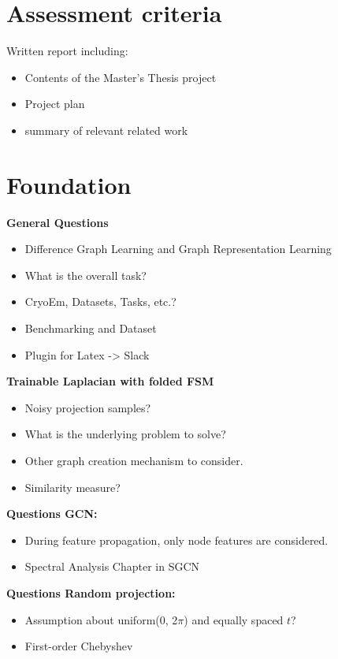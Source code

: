 \chapter{Assessment criteria}
Written report including: 
\begin{itemize}
    \item Contents of the Master's Thesis project
    \item Project plan
    \item summary of relevant related work
\end{itemize}

\chapter{Foundation}

\textbf{General Questions}
\begin{itemize}
    \item Difference Graph Learning and Graph Representation Learning
    \item What is the overall task?
    \item CryoEm, Datasets, Tasks, etc.?
    \item Benchmarking and Dataset
    \item Plugin for Latex -> Slack
\end{itemize}

\textbf{Trainable Laplacian with folded FSM}
\begin{itemize}
    \item Noisy projection samples?
    \item What is the underlying problem to solve?
    \item Other graph creation mechanism to consider.
    \item Similarity measure?
\end{itemize}

\textbf{Questions GCN:}
\begin{itemize}
    \item During feature propagation, only node features are considered.
    \item Spectral Analysis Chapter in SGCN
\end{itemize}

\textbf{Questions Random projection:}
\begin{itemize}
    \item Assumption about uniform(0, 2$\pi$) and equally spaced $t$?
    \item First-order Chebyshev
\end{itemize}

